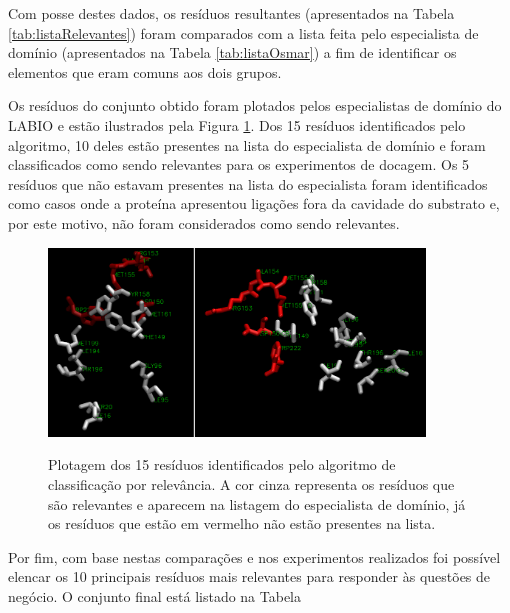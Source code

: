 Com posse destes dados, os resíduos resultantes (apresentados na Tabela \ref{tab:listaRelevantes}) foram comparados com a lista feita pelo especialista de domínio (apresentados na Tabela \ref{tab:listaOsmar}) a fim de identificar os elementos que eram comuns aos dois grupos. 

Os resíduos do conjunto obtido foram plotados pelos especialistas de domínio do LABIO e estão ilustrados pela Figura \ref{fig:PlotResiduos}. Dos 15 resíduos identificados pelo algoritmo, 10 deles estão presentes na lista do especialista de domínio e foram classificados como sendo relevantes para os experimentos de docagem. Os 5 resíduos que não estavam presentes na lista do especialista foram identificados como casos onde a proteína apresentou ligações fora da cavidade do substrato e, por este motivo, não foram considerados como sendo relevantes.

\begin{figure}[h]
        \center
        \includegraphics[width=10cm]{images/avaliacao_Residuos_nomes.png}
        \label{fig:PlotResiduos}
        \caption{Plotagem dos 15 resíduos identificados pelo algoritmo de classificação por relevância. A cor cinza representa os resíduos que são relevantes e aparecem na listagem do especialista de domínio, já os resíduos que estão em vermelho não estão presentes na lista.}
\end{figure}

Por fim, com base nestas comparações e nos experimentos realizados foi possível elencar os 10 principais resíduos mais relevantes para responder às questões de negócio. O conjunto final está listado na Tabela

